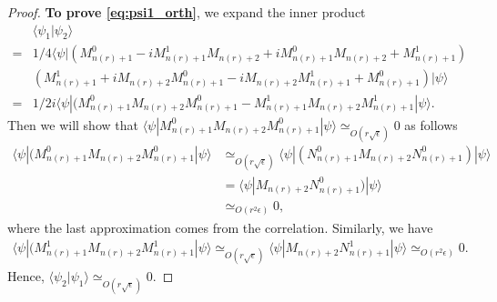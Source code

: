 \documentclass[11pt,letterpaper]{article}
\newcommand{\ket}[1]{|#1\rangle}
\newcommand{\bra}[1]{\langle#1|}
\newcommand{\braket}[2]{\langle#1|#2\rangle}
\newcommand{\1}{\mathbb{1}}
\newcommand{\nr}{n(r)}
\newcommand{\ep}{\epsilon}
\newcommand{\se}{\sqrt{\epsilon}}
\newcommand{\appd}[1]{\simeq_{#1}}
\theoremstyle{definition}
\begin{document}
\begin{proof}
	\textbf{To prove \cref{eq:psi1_orth}}, we expand the inner product
	\begin{align*}
		&\braket{\psi_1}{\psi_2}\\
	 = &1/4\bra{\psi}(M_{\nr+1}^0 - iM_{\nr+1}^1M_{\nr+2} + iM_{\nr+1}^0M_{\nr+2} +M_{\nr+1}^1)\\
	 &(M_{\nr+1}^1 + iM_{\nr+2}M_{\nr+1}^0 -iM_{\nr+2}M_{\nr+1}^1 + M_{\nr+1}^0)\ket{\psi}\\
	 =& 1/2i \bra{\psi}(M_{\nr+1}^0M_{\nr+2}M_{\nr+1}^0-M_{\nr+1}^1M_{\nr+2}M_{\nr+1}^1\ket{\psi}.
	\end{align*}
	Then we will show that $\bra{\psi} M_{\nr+1}^0M_{\nr+2}M_{\nr+1}^0 \ket{\psi} \appd{O( r\se)} 0$ as follows
	\begin{align*}
	 \bra{\psi}(M_{\nr+1}^0M_{\nr+2}M_{\nr+1}^0\ket{\psi} &\appd{O(r\se)}  \bra{\psi}(N_{\nr+1}^0M_{\nr+2}N_{\nr+1}^0)\ket{\psi}\\
	  &=\bra{\psi}M_{\nr+2}N_{\nr+1}^0)\ket{\psi}\\
	&\appd{O(r^2\ep)} 0,
	\end{align*}
	where the last approximation comes from the correlation.
	Similarly, we have 
	\begin{align*}
	\bra{\psi}(M_{\nr+1}^1M_{\nr+2}M_{\nr+1}^1\ket{\psi} \appd{O(r\se)} \bra{\psi} M_{\nr+2}N_{\nr+1}^1 \ket{\psi} \appd{O(r^2\ep)} 0.
	\end{align*}
	Hence, $\braket{\psi_2}{\psi_1} \appd{O(r\se)} 0$.
	

\end{proof}
\end{document}
